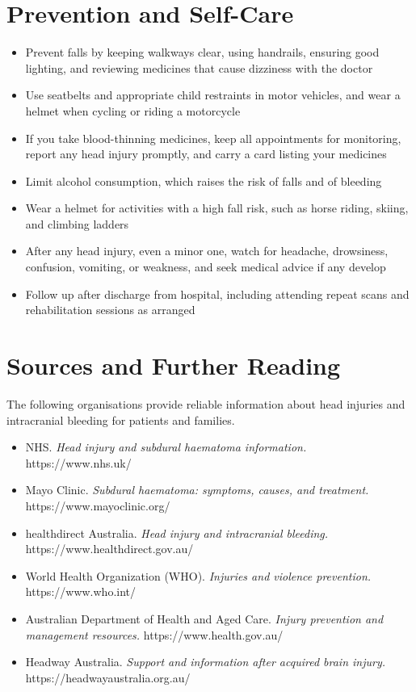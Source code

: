 \section*{Prevention and Self-Care}
\begin{itemize}
    \item Prevent falls by keeping walkways clear, using handrails, ensuring good lighting, and reviewing medicines that cause dizziness with the doctor
    \item Use seatbelts and appropriate child restraints in motor vehicles, and wear a helmet when cycling or riding a motorcycle
    \item If you take blood-thinning medicines, keep all appointments for monitoring, report any head injury promptly, and carry a card listing your medicines
    \item Limit alcohol consumption, which raises the risk of falls and of bleeding
    \item Wear a helmet for activities with a high fall risk, such as horse riding, skiing, and climbing ladders
    \item After any head injury, even a minor one, watch for headache, drowsiness, confusion, vomiting, or weakness, and seek medical advice if any develop
    \item Follow up after discharge from hospital, including attending repeat scans and rehabilitation sessions as arranged
\end{itemize}

\section*{Sources and Further Reading}
The following organisations provide reliable information about head injuries and intracranial bleeding for patients and families.

\begin{itemize}
    \item NHS. \textit{Head injury and subdural haematoma information.} https://www.nhs.uk/
    \item Mayo Clinic. \textit{Subdural haematoma: symptoms, causes, and treatment.} https://www.mayoclinic.org/
    \item healthdirect Australia. \textit{Head injury and intracranial bleeding.} https://www.healthdirect.gov.au/
    \item World Health Organization (WHO). \textit{Injuries and violence prevention.} https://www.who.int/
    \item Australian Department of Health and Aged Care. \textit{Injury prevention and management resources.} https://www.health.gov.au/
    \item Headway Australia. \textit{Support and information after acquired brain injury.} https://headwayaustralia.org.au/
\end{itemize}

\clearpage
